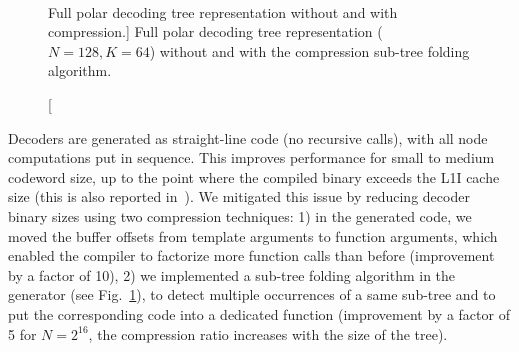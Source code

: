 \begin{figure}[htp]
  \centering
  \\
  \caption
    [Full polar decoding tree representation without and with compression.]
    {Full polar decoding tree representation ($N = 128, K = 64$) without and
    with the compression sub-tree folding algorithm.}
  \label{fig:eval_polar_sc_gen_compression}
\end{figure}

Decoders are generated as straight-line code (no recursive calls), with all node
computations put in sequence. This improves performance for small to medium
codeword size, up to the point where the compiled binary exceeds the L1I cache
size (this is also reported in~\cite{Giard2016b}). We mitigated this issue by
reducing decoder binary sizes using two compression techniques: 1) in the
generated code, we moved the buffer offsets from template arguments to function
arguments, which enabled the compiler to factorize more function calls than
before (improvement by a factor of 10), 2) we implemented a sub-tree folding
algorithm in the generator (see Fig.~\ref{fig:eval_polar_sc_gen_compression}),
to detect multiple occurrences of a same sub-tree and to put the corresponding
code into a dedicated function (improvement by a factor of 5 for $N=2^{16}$, the
compression ratio increases with the size of the tree).

